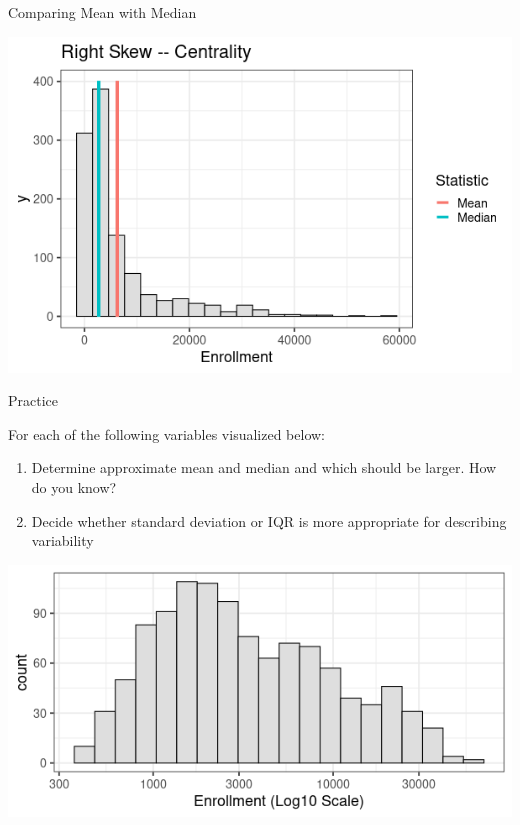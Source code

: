 \documentclass{beamer}
\begin{document}
\begin{frame}{Comparing Mean with Median}
\begin{center}
\includegraphics[scale=0.5]{center_skew.png}
\end{center}
\end{frame}




\begin{frame}{Practice}

{\small
For each of the following variables visualized below:
\begin{enumerate}
\item Determine approximate mean and median and which should be larger. How do you know?
\item Decide whether standard deviation or IQR is more appropriate for describing variability
\end{enumerate}
}
\begin{center}
\includegraphics[scale=0.5]{mult_dist3.png}
\end{center}
\end{frame}
\end{document}
